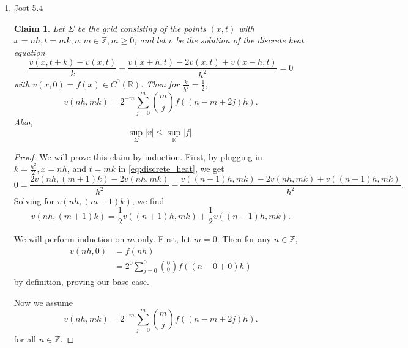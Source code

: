 \documentclass[a4paper]{article}
\newtheorem*{claim}{Claim}
\newcommand{\R}{\mathbb{R}}
\newcommand{\Z}{\mathbb{Z}}
\begin{document}
\begin{enumerate}
\begin{proof}
    By letting $\varepsilon \to 0$, we get
    \[ \max_{\overline{\Omega}_T } u = \max_{\partial^\ast \Omega_T} u .\]
    \textbf{NEED TO CONSIDER $T=\infty$}

  \end{proof}

  \item Jost 5.4
    \begin{claim}
      Let $\Sigma$ be the grid consisting of the points $(x,t)$ with $x = nh, t = mk, n,m \in \Z, m \geq 0$, and let $v$ be the solution of the
      discrete heat equation
      \begin{equation} \label{eq:discrete_heat}
        \frac{v(x,t+k) - v(x,t)}{k} - \frac{v(x+h,t) - 2v(x,t) + v(x-h,t)}{h^2} = 0
    \end{equation}
      with $v(x,0) = f(x) \in C^0(\R)$.
      Then for $\frac{k}{h^2} = \frac{1}{2}$,
      \[ v(nh, mk) = 2^{-m} \sum_{j=0}^m \binom{m}{j} f \left( (n - m + 2j)h \right) .\]
      Also,
      \[ \sup_{\Sigma} |v| \leq \sup_\R |f|. \]
    \end{claim}

    \begin{proof}
      We will prove this claim by induction.
      First, by plugging in $k=\frac{h^2}{2}, x = nh$, and $t = mk$ in \eqref{eq:discrete_heat}, we get
      \begin{equation} \label{eq:heat_rec}
        0 = \frac{2 v(nh, (m+1)k) - 2v(nh,mk)}{h^2} - \frac{v((n+1)h,mk) - 2v(nh,mk) + v(( n-1)h,mk) }{h^2} .
      \end{equation}
      Solving for $v(nh,(m+1)k)$, we find
      \[ v(nh,(m+1)k) = \frac{1}{2} v( (n+1)h, mk) + \frac{1}{2} v( (n-1)h, mk) .\]

      We will perform induction on $m$ only. First, let $m=0$. Then for any $n \in \Z$,
      \begin{align*}
        v(nh,0) &= f(nh) \\
        &= 2^{0} \sum_{j=0}^0 \binom{0}{0} f( (n - 0 + 0)h)
      \end{align*}
      by definition, proving our base case.

      Now we assume
      \[ v(nh, mk) = 2^{-m} \sum_{j=0}^m \binom{m}{j} f \left( (n - m + 2j)h \right) .\]
      for all $n \in \Z$.


\end{proof}
\end{enumerate}
\end{document}

